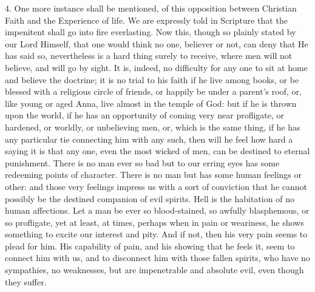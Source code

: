 4. One more instance shall be mentioned, of this opposition between
Christian Faith and the Experience of life. We are expressly told in
Scripture that the impenitent shall go into fire everlasting. Now
this, though so plainly stated by our Lord Himself, that one would
think no one, believer or not, can deny that He has said so,
nevertheless is a hard thing surely to receive, where men will not
believe, and will go by sight. It is, indeed, no difficulty for any
one to sit at home and believe the doctrine; it is no trial to his
faith if he live among books, or be blessed with a religious circle of
friends, or happily be under a parent's roof, or, like young or aged
Anna, live almost in the temple of God: but if he is thrown upon the
world, if he has an opportunity of coming very near profligate, or
hardened, or worldly, or unbelieving men, or, which is the same thing,
if he has any particular tie connecting him with any such, then will
he feel how hard a saying it is that any one, even the most wicked of
men, can be destined to eternal punishment. There is no man ever so
bad but to our erring eyes has some redeeming points of character.
There is no man but has some human feelings or other: and those very
feelings impress us with a sort of conviction that he cannot possibly
be the destined companion of evil spirits. Hell is the habitation of
no human affections. Let a man be ever so blood-stained, so awfully
blasphemous, or so profligate, yet at least, at times, perhaps when in
pain or weariness, he shows something to excite our interest and pity.
And if not, then his very pain seems to plead for him. His capability
of pain, and his showing that he feels it, seem to connect him with
us, and to disconnect him with those fallen spirits, who have no
sympathies, no weaknesses, but are impenetrable and absolute evil,
even though they suffer.

